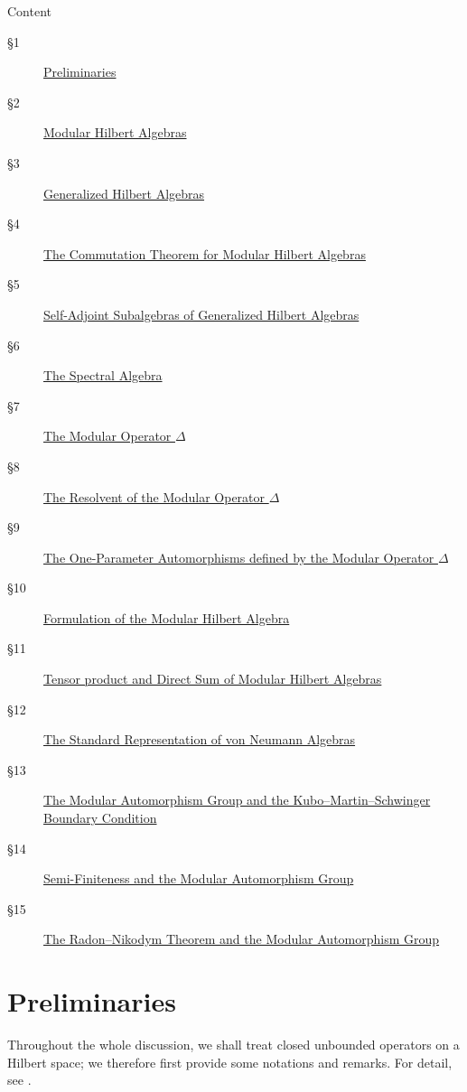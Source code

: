 \documentclass[12pt,b5paper,twoside]{article}
\theoremstyle{takesaki}
\numberwithin{equation}{section}
\begin{document}
\begin{center}
  \large Content
\end{center}
\begin{description}
  \item[\S1] \hyperref[sec:1]{Preliminaries}
  \item[\S2] \hyperref[sec:2]{Modular Hilbert Algebras}
  \item[\S3] \hyperref[sec:3]{Generalized Hilbert Algebras}
  \item[\S4] \hyperref[sec:4]{The Commutation Theorem for Modular Hilbert Algebras}
  \item[\S5] \hyperref[sec:5]{Self-Adjoint Subalgebras of Generalized Hilbert Algebras}
  \item[\S6] \hyperref[sec:6]{The Spectral Algebra}
  \item[\S7] \hyperref[sec:7]{The Modular Operator $\Delta$}
  \item[\S8] \hyperref[sec:8]{The Resolvent of the Modular Operator $\Delta$}
  \item[\S9] \hyperref[sec:9]{The One-Parameter Automorphisms defined by the Modular Operator $\Delta$}
  \item[\S10] \hyperref[sec:10]{Formulation of the Modular Hilbert Algebra}
  \item[\S11] \hyperref[sec:11]{Tensor product and Direct Sum of Modular Hilbert Algebras}

  \item[\S12] \hyperref[sec:12]{The Standard Representation of von Neumann Algebras}
  \item[\S13] \hyperref[sec:13]{The Modular Automorphism Group and the Kubo--Martin--Schwinger Boundary Condition}
  \item[\S14] \hyperref[sec:14]{Semi-Finiteness and the Modular Automorphism Group}
  \item[\S15] \hyperref[sec:15]{The Radon--Nikodym Theorem and the Modular Automorphism Group}
\end{description}

\section{Preliminaries}\label{sec:1}

Throughout the whole discussion, we shall treat closed unbounded
operators on a Hilbert space; we therefore first provide some notations
and remarks.  For detail, see \cite[Chapter~XII]{ref6}.
\end{document}
